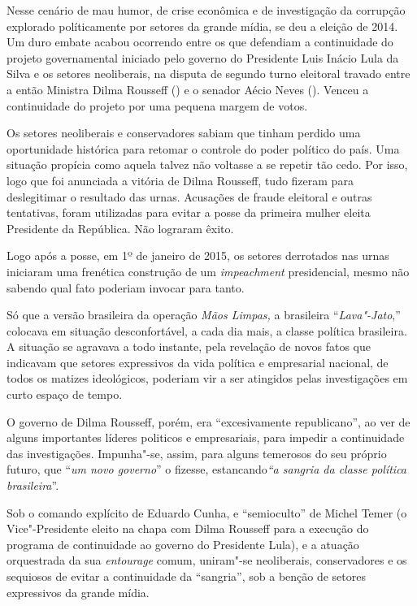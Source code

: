 Nesse cenário de mau humor, de crise econômica e de investigação da
corrupção explorado políticamente por setores da grande mídia, se deu a
eleição de 2014. Um duro embate acabou ocorrendo entre os que defendiam
a continuidade do projeto governamental iniciado pelo governo do
Presidente Luis Inácio Lula da Silva e os setores neoliberais, na
disputa de segundo turno eleitoral travado entre a então Ministra Dilma
Rousseff () e o senador Aécio Neves (). Venceu a continuidade do
projeto por uma pequena margem de votos.

Os setores neoliberais e conservadores sabiam que tinham perdido uma
oportunidade histórica para retomar o controle do poder político do
país. Uma situação propícia como aquela talvez não voltasse a se repetir
tão cedo. Por isso, logo que foi anunciada a vitória de Dilma Rousseff,
tudo fizeram para deslegitimar o resultado das urnas. Acusações de
fraude eleitoral e outras tentativas, foram utilizadas para evitar a
posse da primeira mulher eleita Presidente da República. Não lograram
êxito.

Logo após a posse, em 1º de janeiro de 2015, os setores derrotados nas
urnas iniciaram uma frenética construção de um \emph{impeachment}
presidencial, mesmo não sabendo qual fato poderiam invocar para tanto.

Só que a versão brasileira da operação \emph{Mãos Limpas,} a brasileira
``\emph{Lava"-Jato},'' colocava em situação desconfortável, a cada dia
mais, a classe política brasileira. A situação se agravava a todo
instante, pela revelação de novos fatos que indicavam que setores
expressivos da vida política e empresarial nacional, de todos os matizes
ideológicos, poderiam vir a ser atingidos pelas investigações em curto
espaço de tempo.

O governo de Dilma Rousseff, porém, era ``excesivamente republicano'',
ao ver de alguns importantes líderes politicos e empresariais, para
impedir a continuidade das investigações. Impunha"-se, assim, para alguns
temerosos do seu próprio futuro, que ``\emph{um novo governo}'' o
fizesse, estancando\emph{``a sangria da classe política brasileira}''.

Sob o comando explícito de Eduardo Cunha, e ``semioculto'' de Michel
Temer (o Vice"-Presidente eleito na chapa com Dilma Rousseff para a
execução do programa de continuidade ao governo do Presidente Lula), e a
atuação orquestrada da sua \emph{entourage} comum, uniram"-se
neoliberais, conservadores e os sequiosos de evitar a continuidade da
``sangria'', sob a benção de setores expressivos da grande mídia.

